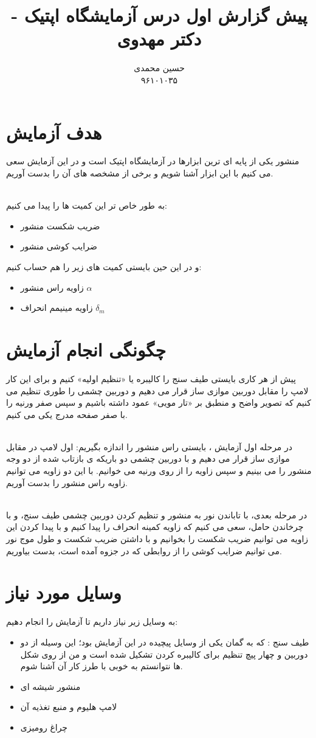 \documentclass{article}
\title{	
	پیش گزارش اول درس آزمایشگاه اپتیک - دکتر مهدوی
}
\author{
حسین محمدی 
\\
۹۶۱۰۱۰۳۵
}
\begin{document}
\maketitle
\section{هدف آزمایش}
منشور یکی از پایه ای ترین ابزارها در آزمایشگاه اپتیک است و در این آزمایش سعی می کنیم با این ابزار آشنا شویم و برخی از مشخصه های آن را بدست آوریم.

\noindent\\
به طور خاص تر این کمیت ها را پیدا می کنیم:
\begin{itemize}
	\item ضریب شکست منشور
	\item ضرایب کوشی منشور
\end{itemize}
و در این حین بایستی کمیت های زیر را هم حساب کنیم:
\begin{itemize}
	\item زاویه راس منشور
	$\alpha$
	\item زاویه مینیمم انحراف
	$\delta_m$
\end{itemize}
\section{چگونگی انجام آزمایش}
پیش از هر کاری بایستی طیف سنج را کالیبره یا «تنظیم اولیه» کنیم و برای این کار لامپ را مقابل دوربین موازی ساز قرار می دهیم و دوربین چشمی را طوری تنظیم می کنیم که تصویر واضح و منطبق بر «تار مویی» عمود داشته باشیم و سپس صفر ورنیه را با صفر صفحه مدرج یکی می کنیم.

\noindent\\
در مرحله اول آزمایش ، بایستی راس منشور را اندازه بگیریم: اول  لامپ در مقابل موازی ساز قرار می دهیم و با دوربین چشمی دو باریکه ی بازتاب شده از دو وجه منشور را می بینیم و سپس زاویه را از روی ورنیه می خوانیم. با این دو زاویه می توانیم زاویه راس منشور را بدست آوریم. 

\noindent\\
در مرحله بعدی، با تاباندن نور به منشور و تنظیم کردن دوربین چشمی طیف سنج، و با چرخاندن حامل، سعی می کنیم که زاویه کمینه انحراف را پیدا کنیم و با پیدا کردن این زاویه می توانیم ضریب شکست را بخوانیم و با داشتن ضریب شکست و طول موج نور می توانیم ضرایب کوشی را از روابطی که در جزوه آمده است، بدست بیاوریم.
\section{وسایل مورد نیاز}
به وسایل زیر نیاز داریم تا آزمایش را انجام دهیم:
\begin{itemize}
	\item طیف سنج
	: که به گمان یکی از وسایل پیچیده در این آزمایش بود؛ این وسیله از دو دوربین و چهار پیچ تنظیم برای کالیبره کردن تشکیل شده است و من از روی شکل ها نتوانستم به خوبی با طرز کار آن آشنا شوم. 
	\item منشور شیشه ای
	\item لامپ هلیوم و منبع تغذیه آن
	\item چراغ رومیزی
\end{itemize}
\end{document}
